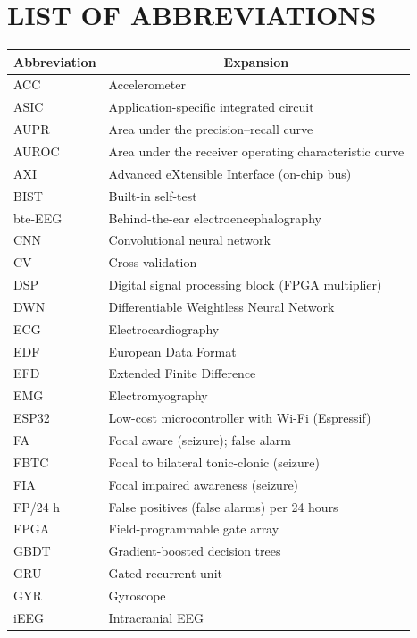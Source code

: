 \chapter*{LIST OF ABBREVIATIONS}
{
\begin{longtable}{|p{32mm}|p{102mm}|}
\hline
\multicolumn{1}{|c|}{\textbf{Abbreviation}} & \multicolumn{1}{c|}{\textbf{Expansion}}\\
\hline
\endhead
ACC & Accelerometer\\
\hline
ASIC & Application-specific integrated circuit\\
\hline
AUPR & Area under the precision--recall curve\\
\hline
AUROC & Area under the receiver operating characteristic curve\\
\hline
AXI & Advanced eXtensible Interface (on-chip bus)\\
\hline
BIST & Built-in self-test\\
\hline
bte-EEG & Behind-the-ear electroencephalography\\
\hline
CNN & Convolutional neural network\\
\hline
CV & Cross-validation\\
\hline
DSP & Digital signal processing block (FPGA multiplier)\\
\hline
DWN & Differentiable Weightless Neural Network\\
\hline
ECG & Electrocardiography\\
\hline
EDF & European Data Format\\
\hline
EFD & Extended Finite Difference\\
\hline
EMG & Electromyography\\
\hline
ESP32 & Low-cost microcontroller with Wi-Fi (Espressif)\\
\hline
FA & Focal aware (seizure); false alarm\\
\hline
FBTC & Focal to bilateral tonic-clonic (seizure)\\
\hline
FIA & Focal impaired awareness (seizure)\\
\hline
FP/24 h & False positives (false alarms) per 24 hours\\
\hline
FPGA & Field-programmable gate array\\
\hline
GBDT & Gradient-boosted decision trees\\
\hline
GRU & Gated recurrent unit\\
\hline
GYR & Gyroscope\\
\hline
iEEG & Intracranial EEG\\

\end{longtable}}
